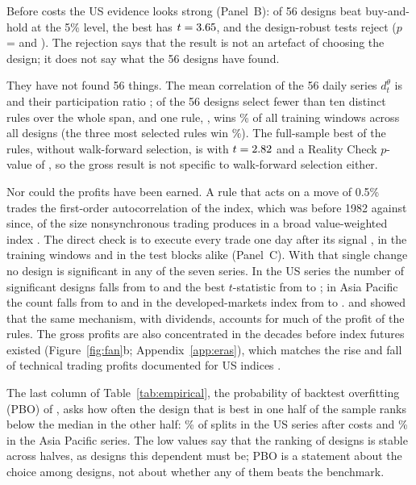 \documentclass[pdflatex,sn-basic]{sn-jnl}
\theoremstyle{thmstyleone}
\theoremstyle{thmstylethree}
\begin{document}
Before costs the US evidence looks strong (Panel~B): \NumUSgrossSig{} of 56 designs beat buy-and-hold at
the 5\% level, the best has $t=3.65$, and the design-robust tests reject ($p$ =
\NumUSgrossPmax{} and \NumUSgrossPavg). The rejection says that the result is not an artefact of
choosing the design; it does not say what the 56 designs have found.

They have not found 56 things. The mean correlation of the 56 daily series $d^{\theta}_t$ is
\NumUSmeanCorr{} and their participation ratio \NumUSneff; \NumUSdistinctLow{} of the 56 designs select
fewer than ten distinct rules over the whole span, and one rule, \NumUStopRule, wins \NumUStopShare\% of
all training windows across all designs (the three most selected rules win \NumUStopThreeShare\%). The
full-sample best of the \NumRules{} rules, without walk-forward selection, is \NumUSclassicRule{} with
$t=2.82$ and a Reality Check $p$-value of \NumUSclassicPrc, so the gross result is not specific
to walk-forward selection either.

Nor could the profits have been earned. A rule that acts on a move of 0.5\% trades the first-order
autocorrelation of the index, which was \NumACpre{} before 1982 against \NumACpost{} since, of the size
nonsynchronous trading produces in a broad value-weighted index \citep{lo1990nonsync}. The direct check
is to execute every trade one day after its signal \citep{bessembinder1998}, in the training windows and
in the test blocks alike (Panel~C). With that single change no design is significant in any of the seven
series. In the US series the number of significant designs falls from \NumUSgrossSig{} to
\NumUSlagSig{} and the best $t$-statistic from \NumUSgrossBestT{} to \NumUSlagBestT; in Asia Pacific the
count falls from \NumAPgrossSig{} to \NumAPlagSig{} and in the developed-markets index from
\NumDVgrossSig{} to \NumDVlagSig. \citet{day2002} and \citet{ready2002} showed that the same mechanism,
with dividends, accounts for much of the profit of the \citet{brock1992} rules. The gross profits are
also concentrated in the decades before index futures existed (Figure~\ref{fig:fan}b;
Appendix~\ref{app:eras}), which matches the rise and fall of technical trading profits documented for
US indices \citep{sullivan1999,taylor2014,zakamulin2014}.

The last column of Table~\ref{tab:empirical}, the probability of backtest overfitting (PBO) of
\citet{bailey2017}, asks how often the design that is best in one half of the sample ranks below the
median in the other half: \NumUSnetPBO\% of splits in the US series after costs and \NumAPnetPBO\% in
the Asia Pacific series. The low values say that the ranking of designs is stable across halves, as
designs this dependent must be; PBO is a statement about the choice among designs, not about whether any
of them beats the benchmark.
\end{document}
